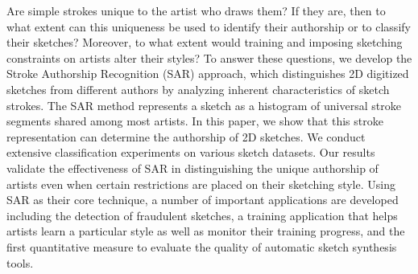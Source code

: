 Are simple strokes unique to the artist who draws them?  If they are, then to what extent can this uniqueness be used to identify their authorship or to classify their sketches? Moreover, to what extent would training and imposing sketching constraints on artists alter their styles? To answer these questions, we develop the Stroke Authorship Recognition (SAR) approach, which distinguishes 2D digitized sketches from different authors by analyzing inherent characteristics of sketch strokes. The SAR method represents a sketch as a histogram of universal stroke segments shared among most artists. In this paper, we show that this stroke representation can determine the authorship of 2D sketches. We conduct extensive classification experiments on various sketch datasets. Our results validate the effectiveness of SAR in distinguishing the unique authorship of artists even when certain restrictions are placed on their sketching style.  Using SAR as their core technique, a number of important applications are developed including the detection of fraudulent sketches, a training application that helps artists learn a particular style as well as monitor their training progress, and the first quantitative measure to evaluate the quality of automatic sketch synthesis tools.




